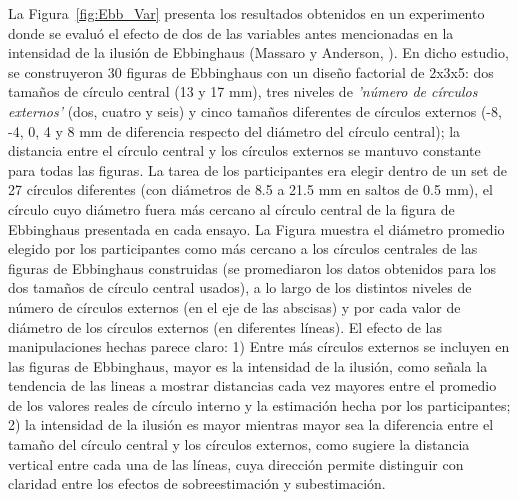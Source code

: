 La Figura~\ref{fig:Ebb_Var} presenta los resultados obtenidos en un experimento donde se evaluó el efecto de dos de las variables antes mencionadas en la intensidad de la ilusión de Ebbinghaus (Massaro y Anderson, \citeyear{Massaro1971}). En dicho estudio, se construyeron 30 figuras de Ebbinghaus con un diseño factorial de 2x3x5: dos tamaños de círculo central (13 y 17 mm), tres niveles de \textit{'número de círculos externos'} (dos, cuatro y seis) y cinco tamaños diferentes de círculos externos (-8, -4, 0, 4 y 8 mm de diferencia respecto del diámetro del círculo central); la distancia entre el círculo central y los círculos externos se mantuvo constante para todas las figuras. La tarea de los participantes era elegir dentro de un set de 27 círculos diferentes (con diámetros de 8.5 a 21.5 mm en saltos de 0.5 mm), el círculo cuyo diámetro fuera más cercano al círculo central de la figura de Ebbinghaus presentada en cada ensayo. La Figura muestra el diámetro promedio elegido por los participantes como más cercano a los círculos centrales de las figuras de Ebbinghaus construidas (se promediaron los datos obtenidos para los dos tamaños de círculo central usados), a lo largo de los distintos niveles de número de círculos externos (en el eje de las abscisas) y por cada valor de diámetro de los círculos externos (en diferentes líneas). El efecto de las manipulaciones hechas parece claro: 1) Entre más círculos externos se incluyen en las figuras de Ebbinghaus, mayor es la intensidad de la ilusión, como señala la tendencia de las lineas a mostrar distancias cada vez mayores entre el promedio de los valores reales de círculo interno y la estimación hecha por los participantes; 2) la intensidad de la ilusión es mayor mientras mayor sea la diferencia entre el tamaño del círculo central y los círculos externos, como sugiere la distancia vertical entre cada una de las líneas, cuya dirección permite distinguir con claridad entre los efectos de sobreestimación y subestimación.\\

